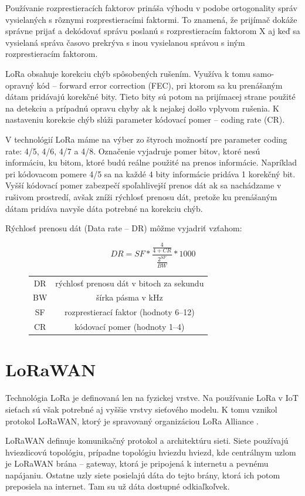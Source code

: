 \documentclass[slovak,master]{diploma}
\begin{document}
Používanie rozprestieracích faktorov prináša výhodu v podobe ortogonality správ vysielaných s rôznymi rozprestieracími faktormi. 
To znamená, že prijímač dokáže správne prijať a dekódovať správu poslanú s rozprestieracím faktorom X aj 
keď sa vysielaná správa časovo prekrýva s inou vysielanou správou s iným rozprestieracím faktorom.

LoRa obsahuje korekciu chýb spôsobených rušením. Využíva k tomu samo-opravný kód -- forward error correction (FEC), pri ktorom 
sa ku prenášaným dátam pridávajú korekčné bity. Tieto bity sú potom na prijímacej strane použité na detekciu a prípadnú opravu chyby ak k nejakej došlo vplyvom rušenia.
K nastaveniu korekcie chýb slúži parameter kódovací pomer -- coding rate (CR).

V technológií LoRa máme na výber zo štyroch možností pre parameter coding rate: 4/5, 4/6, 4/7 a 4/8. 
Označenie vyjadruje pomer bitov, ktoré nesú informáciu, ku bitom, ktoré budú reálne použité na prenos informácie. 
Napríklad pri kódovacom pomere 4/5 sa na každé 4 bity informácie pridáva 1 korekčný bit.
Vyšší kódovací pomer zabezpečí spoľahlivejší prenos dát ak sa nachádzame v rušivom prostredí, avšak zníži rýchlosť prenosu dát, 
pretože ku prenášaným dátam pridáva navyše dáta potrebné na korekciu chýb.

Rýchlosť prenosu dát (Data rate -- DR) môžme vyjadriť vzťahom:
\begin{figure}[h!]
  \centering
  \[DR = SF * \frac{\frac{4}{4+CR}}{\frac{2^{SF}}{BW}} *1000 \]
  \begin{tabular}{c c}
    DR & rýchlosť prenosu dát v bitoch za sekundu\\
    BW & šírka pásma v kHz \\
    SF & rozprestierací faktor (hodnoty 6--12) \\
    CR & kódovací pomer (hodnoty 1--4) \\
  \end{tabular}
\end{figure}

\section{LoRaWAN}
Technológia LoRa je definovaná len na fyzickej vrstve. Na používanie LoRa v IoT sieťach sú však potrebné aj vyššie vrstvy sieťového modelu.
K tomu vznikol protokol LoRaWAN, ktorý je spravovaný organizáciou LoRa Alliance \cite{lora}.

LoRaWAN definuje komunikačný protokol a architektúru sieti. Siete používajú hviezdicovú topológiu, prípadne topológiu hviezdu hviezd, kde 
centrálnym uzlom je LoRaWAN brána -- gateway, ktorá je pripojená k internetu a pevnému napájaniu. Ostatne uzly siete posielajú dáta do tejto brány, 
ktorá ich potom preposiela na internet. Tam su už dáta dostupné odkiaľkoľvek.
\end{document}
